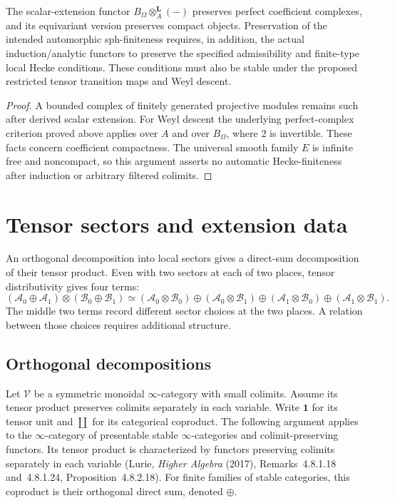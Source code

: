 \begin{proposition}
\label{v4-arith:w6-d:prop:sph-fin-cont}
The scalar-extension functor
$B_\Omega\otimes_A^{\mathbf L}(-)$ preserves perfect coefficient
complexes, and its equivariant version preserves compact objects.
Preservation of the intended automorphic sph-finiteness requires,
in addition, the actual induction/analytic functors to preserve the
specified admissibility and finite-type local Hecke conditions.
These conditions must also be stable under the proposed restricted
tensor transition maps and Weyl descent.
\end{proposition}
\begin{proof}
A bounded complex of finitely generated projective modules remains
such after derived scalar extension. For Weyl descent the underlying
perfect-complex criterion proved above applies over $A$ and over
$B_\Omega$, where $2$ is invertible. These facts concern coefficient
compactness. The universal smooth family $E$ is infinite free and
noncompact, so this argument asserts no automatic Hecke-finiteness
after induction or arbitrary filtered colimits.
\end{proof}

\section{Tensor sectors and extension data}

An orthogonal decomposition into local sectors gives a direct-sum
decomposition of their tensor product. Even with two sectors
at each of two places, tensor distributivity gives four terms:
\[
 (\mathcal A_0\oplus\mathcal A_1)\otimes
 (\mathcal B_0\oplus\mathcal B_1)
 \simeq
 (\mathcal A_0\otimes\mathcal B_0)\oplus
 (\mathcal A_0\otimes\mathcal B_1)\oplus
 (\mathcal A_1\otimes\mathcal B_0)\oplus
 (\mathcal A_1\otimes\mathcal B_1).
\]
The middle two terms record different sector choices at the two places.
A relation between those choices requires additional structure.

\subsection{Orthogonal decompositions}

Let $\mathcal V$ be a symmetric monoidal $\infty$-category with small
colimits. Assume its tensor product preserves colimits separately in each
variable. Write $\mathbf1$ for its tensor unit and $\coprod$ for its
categorical coproduct. The following argument applies to the
$\infty$-category of presentable stable $\infty$-categories and
colimit-preserving functors. Its tensor product is characterized by
functors preserving colimits separately in each variable
(Lurie, \emph{Higher Algebra} (2017), Remarks~4.8.1.18 and~4.8.1.24, Proposition~4.8.2.18).
For finite families of stable categories, this coproduct is their
orthogonal direct sum, denoted $\oplus$.

